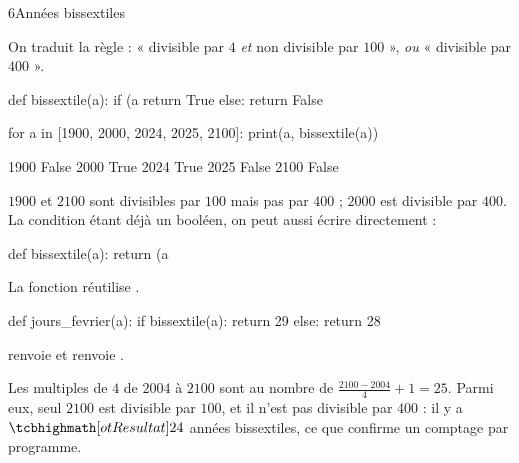 \begin{corrige}{6}{Années bissextiles}
\begin{questions}
  \item On traduit la règle : « divisible par $4$ \emph{et} non divisible par $100$ », \emph{ou} « divisible par $400$ ».
\begin{codecote}[0.76]
\begin{pythoncol}
def bissextile(a):
    if (a %
        return True
    else:
        return False

for a in [1900, 2000, 2024, 2025, 2100]:
    print(a, bissextile(a))
\end{pythoncol}
\cote
\begin{consolecol}
1900 False
2000 True
2024 True
2025 False
2100 False
\end{consolecol}
\end{codecote}
    $1900$ et $2100$ sont divisibles par $100$ mais pas par $400$ ; $2000$ est divisible par $400$. La condition étant déjà un booléen,
    on peut aussi écrire directement :
\begin{python}
def bissextile(a):
    return (a %
\end{python}
  \item La fonction réutilise .
\begin{codecote}
\begin{pythoncol}
def jours_fevrier(a):
    if bissextile(a):
        return 29
    else:
        return 28
\end{pythoncol}
\cote
{} renvoie  et  renvoie .
\end{codecote}
  \item Les multiples de $4$ de $2004$ à $2100$ sont au nombre de $\frac{2100-2004}{4}+1=25$. Parmi eux, seul $2100$ est divisible par
    $100$, et il n'est pas divisible par $400$ : il y a $\res{24}$ années bissextiles, ce que confirme un comptage par programme.
\end{questions}
\end{corrige}

